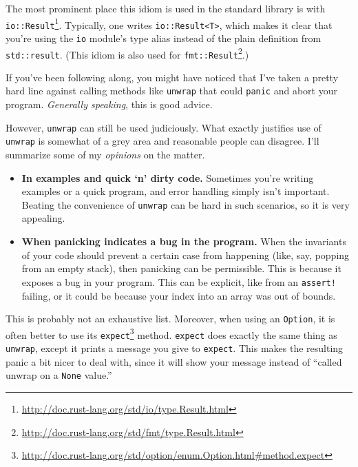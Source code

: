 \documentclass[a4paper,]{book}
\renewcommand{\href}[2]{#2\footnote{\url{#1}}}
\providecommand{\tightlist}{%
  \setlength{\itemsep}{0pt}\setlength{\parskip}{0pt}}
\begin{document}
The most prominent place this idiom is used in the standard library is
with
\href{http://doc.rust-lang.org/std/io/type.Result.html}{\texttt{io::Result}}.
Typically, one writes \texttt{io::Result\textless{}T\textgreater{}},
which makes it clear that you're using the \texttt{io} module's type
alias instead of the plain definition from \texttt{std::result}. (This
idiom is also used for
\href{http://doc.rust-lang.org/std/fmt/type.Result.html}{\texttt{fmt::Result}}.)


If you've been following along, you might have noticed that I've taken a
pretty hard line against calling methods like \texttt{unwrap} that could
\texttt{panic} and abort your program. \emph{Generally speaking}, this
is good advice.

However, \texttt{unwrap} can still be used judiciously. What exactly
justifies use of \texttt{unwrap} is somewhat of a grey area and
reasonable people can disagree. I'll summarize some of my
\emph{opinions} on the matter.

\begin{itemize}
\tightlist
\item
  \textbf{In examples and quick `n' dirty code.} Sometimes you're
  writing examples or a quick program, and error handling simply isn't
  important. Beating the convenience of \texttt{unwrap} can be hard in
  such scenarios, so it is very appealing.
\item
  \textbf{When panicking indicates a bug in the program.} When the
  invariants of your code should prevent a certain case from happening
  (like, say, popping from an empty stack), then panicking can be
  permissible. This is because it exposes a bug in your program. This
  can be explicit, like from an \texttt{assert!} failing, or it could be
  because your index into an array was out of bounds.
\end{itemize}

This is probably not an exhaustive list. Moreover, when using an
\texttt{Option}, it is often better to use its
\href{http://doc.rust-lang.org/std/option/enum.Option.html\#method.expect}{\texttt{expect}}
method. \texttt{expect} does exactly the same thing as \texttt{unwrap},
except it prints a message you give to \texttt{expect}. This makes the
resulting panic a bit nicer to deal with, since it will show your
message instead of ``called unwrap on a \texttt{None} value.''
\end{document}
